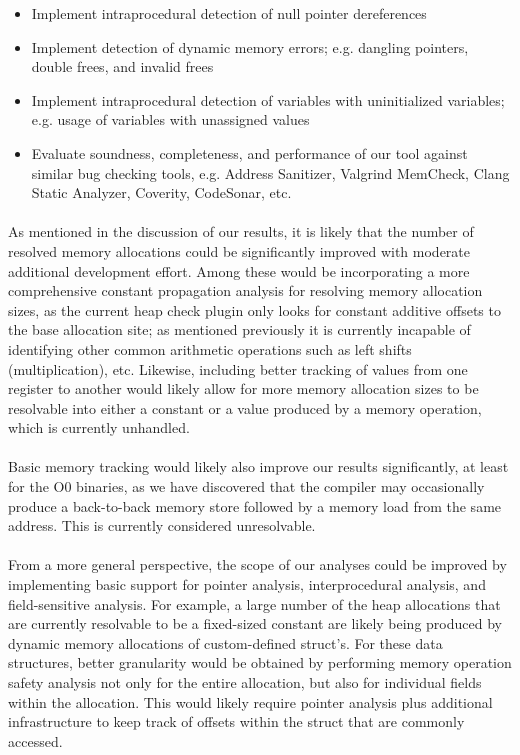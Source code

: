 \documentclass[letterpaper,11pt]{article}
\begin{document}
\begin{itemize}
  \item Implement intraprocedural detection of null pointer dereferences
  \item  Implement detection of dynamic memory errors; e.g. dangling pointers,
double frees, and invalid frees
\item Implement intraprocedural detection of variables with uninitialized
variables; e.g. usage of variables with unassigned values
\item Evaluate soundness, completeness, and performance of our tool
  against similar bug checking tools, e.g. Address Sanitizer, Valgrind
  MemCheck, Clang Static Analyzer, Coverity, CodeSonar, etc.
\end{itemize}

\paragraph{}
As mentioned in the discussion of our results, it is likely that the number of
resolved memory allocations could be significantly improved with moderate
additional development effort. Among these would be incorporating a more
comprehensive constant propagation analysis for resolving memory allocation
sizes, as the current heap check plugin only looks for constant additive
offsets to the base allocation site; as mentioned previously it is currently
incapable of identifying other common arithmetic operations such as left shifts
(multiplication), etc. Likewise, including better tracking of values from one
register to another would likely allow for more memory allocation sizes to be
resolvable into either a constant or a value produced by a memory operation,
which is currently unhandled.

\paragraph{}
Basic memory tracking would likely also improve our results significantly, at
least for the O0 binaries, as we have discovered that the compiler may
occasionally produce a back-to-back memory store followed by a memory load from
the same address. This is currently considered unresolvable.

\paragraph{}
From a more general perspective, the scope of our analyses could be improved by
implementing basic support for pointer analysis, interprocedural analysis, and
field-sensitive analysis. For example, a large number of the heap allocations
that are currently resolvable to be a fixed-sized constant are likely being
produced by dynamic memory allocations of custom-defined struct’s. For these
data structures, better granularity would be obtained by performing memory
operation safety analysis not only for the entire allocation, but also for
individual fields within the allocation. This would likely require pointer
analysis plus additional infrastructure to keep track of offsets within the
struct that are commonly accessed.
\end{document}
